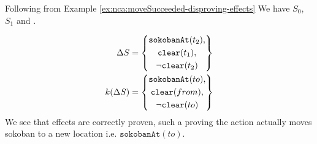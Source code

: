 \documentclass[../Master.tex]{subfiles}
\begin{document}
\begin{example} \label{ex:nca:moveSucceeded-proving-effects}
	Following from Example \ref{ex:nca:moveSucceeded-disproving-effects}
	We have $S_0$, $S_1$ and \lits.
	
	\begin{equation*}
	\begin{split}
	\Delta S &=
	\left\{
	\begin{gathered}
	\texttt{sokobanAt}(t_2), \\
	\texttt{clear}(t_1), \\
	\neg \texttt{clear}(t_2)		
	\end{gathered}
	\right\} \\	
	k(\Delta S) &= \left\{
	\begin{gathered}
	\texttt{sokobanAt}(to), \\
	\texttt{clear}(from), \\
	\neg \texttt{clear}(to)		
	\end{gathered}
	\right\}
	\end{split}
	\end{equation*}
	We see that effects are correctly proven, such a proving the action actually moves sokoban to a new location i.e. $\texttt{sokobanAt}(to)$.
\end{example}
\end{document}
